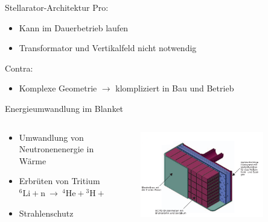 \documentclass[aspectratio=169,xcolor=dvipsnames,14pt]{beamer}
\begin{document}
    \begin{frame}{Stellarator-Architektur}
        \color{LightGrey}
        Pro:
        \begin{itemize}
            \color{LightGrey}
            \item Kann im Dauerbetrieb laufen
            \item Transformator und Vertikalfeld nicht notwendig
        \end{itemize}
        Contra:
        \begin{itemize}
            \color{LightGrey}
            \item Komplexe Geometrie $\to$ klompliziert in Bau und Betrieb
        \end{itemize}
    \end{frame}

\begin{frame}{Energieumwandlung im Blanket}
    \begin{columns}
        \begin{column}{0.5\textwidth}
            \begin{itemize}
                \color{LightGrey}
                \item Umwandlung von Neutronenenergie in Wärme
                \item Erbrüten von Tritium \break \begin{math}
                    {\displaystyle ^{6}\mathrm {Li} +\mathrm {n} \ \to \ ^{4}\mathrm {He} +{}^{3}\mathrm {H} +4{,}8\;\mathrm {MeV} } \end{math}
                \item Strahlenschutz
            \end{itemize}
        \end{column}
        \begin{column}{0.5\textwidth}
            \begin{figure}
                \centering
                \includegraphics[width=0.85\textwidth]{Images/Blanket.png}
            \end{figure}
        \end{column}
    \end{columns}
\end{frame}
\end{document}
